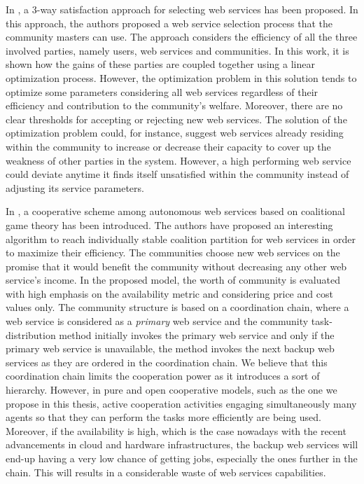 In \cite{DBLP:conf/IEEEscc/LimTMB12}, a 3-way satisfaction approach
for selecting web services has been proposed. In this approach,
the authors proposed a web service selection process that the
community masters can use. The approach considers the efficiency
of all the three involved parties, namely users, web services and
communities. In this work, it is shown how the gains of these
parties are coupled together using a linear optimization process.
However, the optimization problem in this solution tends to
optimize some parameters considering all web services regardless
of their efficiency and contribution to the community's welfare.
Moreover, there are no clear thresholds for accepting or rejecting
new web services. The solution of the optimization problem could,
for instance, suggest web services already residing within the
community to increase or decrease their capacity to cover up the
weakness of other parties in the system. However, a high
performing web service could deviate anytime it finds itself
unsatisfied within the community instead of adjusting its service
parameters.

In \cite{10.1109/TSC.2012.12}, a cooperative scheme among
autonomous web services based on coalitional game theory has been
introduced. The authors have proposed an interesting algorithm to
reach individually stable coalition partition for web services in
order to maximize their efficiency. The communities choose new web
services on the promise that it would benefit the community
without decreasing any other web service's income. In the proposed
model, the worth of community is evaluated with high emphasis on
the availability metric and considering price and cost values
only. The community structure is based on a coordination chain,
where a web service is considered as a \emph{primary} web service
and the community task-distribution method initially invokes the
primary web service and only if the primary web service is
unavailable, the method invokes the next backup web services as
they are ordered in the coordination chain. We believe that this
coordination chain limits the cooperation power as it introduces a
sort of hierarchy. However, in pure and open cooperative models,
such as the one we propose in this thesis, active cooperation
activities engaging simultaneously many agents so that they can
perform the tasks more efficiently are being used. Moreover, if
the availability is high, which is the case nowadays with the
recent advancements in cloud and hardware infrastructures, the
backup web services will end-up having a very low chance of
getting jobs, especially the ones further in the chain. This will
results in a considerable waste of web services capabilities.

